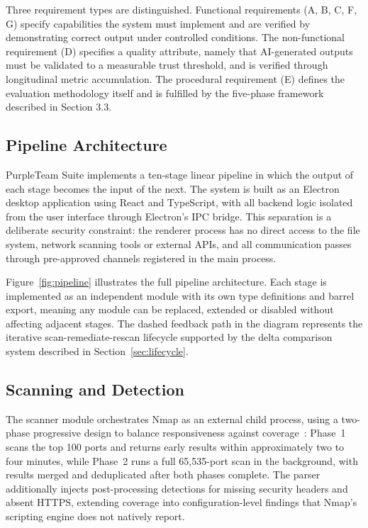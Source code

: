 \documentclass[12pt, a4paper, oneside]{report}
\begin{document}
Three requirement types are distinguished. Functional requirements (A, B, C, F, G) specify capabilities the system must implement and are verified by demonstrating correct output under controlled conditions. The non-functional requirement (D) specifies a quality attribute, namely that AI-generated outputs must be validated to a measurable trust threshold, and is verified through longitudinal metric accumulation. The procedural requirement (E) defines the evaluation methodology itself and is fulfilled by the five-phase framework described in Section 3.3.

\subsection{Pipeline Architecture}

PurpleTeam Suite implements a ten-stage linear pipeline in which the output of each stage becomes the input of the next. The system is built as an Electron desktop application using React and TypeScript, with all backend logic isolated from the user interface through Electron's IPC bridge. This separation is a deliberate security constraint: the renderer process has no direct access to the file system, network scanning tools or external APIs, and all communication passes through pre-approved channels registered in the main process.

Figure~\ref{fig:pipeline} illustrates the full pipeline architecture. Each stage is implemented as an independent module with its own type definitions and barrel export, meaning any module can be replaced, extended or disabled without affecting adjacent stages. The dashed feedback path in the diagram represents the iterative scan-remediate-rescan lifecycle supported by the delta comparison system described in Section~\ref{sec:lifecycle}.
 



\subsection{Scanning and Detection}

The scanner module orchestrates Nmap as an external child process, using a two-phase progressive design to balance responsiveness against coverage~\cite{chalvatzis2019}: Phase~1 scans the top 100 ports and returns early results within approximately two to four minutes, while Phase~2 runs a full 65,535-port scan in the background, with results merged and deduplicated after both phases complete. The parser additionally injects post-processing detections for missing security headers and absent HTTPS, extending coverage into configuration-level findings that Nmap's scripting engine does not natively report.
\end{document}
